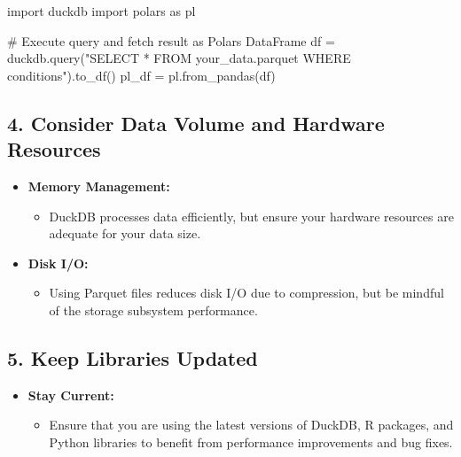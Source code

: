 \documentclass[
  american,
  10,
  a4paper,
]{book}
\newenvironment{Shaded}{\begin{snugshade}}{\end{snugshade}}
\newcommand{\CommentTok}[1]{\textcolor[rgb]{0.37,0.37,0.37}{#1}}
\newcommand{\ImportTok}[1]{\textcolor[rgb]{0.00,0.46,0.62}{#1}}
\newcommand{\NormalTok}[1]{\textcolor[rgb]{0.00,0.23,0.31}{#1}}
\newcommand{\OperatorTok}[1]{\textcolor[rgb]{0.37,0.37,0.37}{#1}}
\newcommand{\StringTok}[1]{\textcolor[rgb]{0.13,0.47,0.30}{#1}}
\providecommand{\tightlist}{%
  \setlength{\itemsep}{0pt}\setlength{\parskip}{0pt}}
\theoremstyle{definition}
\theoremstyle{remark}
\begin{document}
\begin{Shaded}
\begin{Highlighting}[]
\ImportTok{import}\NormalTok{ duckdb}
\ImportTok{import}\NormalTok{ polars }\ImportTok{as}\NormalTok{ pl}

\CommentTok{\# Execute query and fetch result as Polars DataFrame}
\NormalTok{df }\OperatorTok{=}\NormalTok{ duckdb.query(}\StringTok{"SELECT * FROM \textquotesingle{}your\_data.parquet\textquotesingle{} WHERE conditions"}\NormalTok{).to\_df()}
\NormalTok{pl\_df }\OperatorTok{=}\NormalTok{ pl.from\_pandas(df)}
\end{Highlighting}
\end{Shaded}

\subsection{\texorpdfstring{\textbf{4. Consider Data Volume and Hardware
Resources}}{4. Consider Data Volume and Hardware Resources}}\label{consider-data-volume-and-hardware-resources}

\begin{itemize}
\item
  \textbf{Memory Management:}

  \begin{itemize}
  \tightlist
  \item
    DuckDB processes data efficiently, but ensure your hardware
    resources are adequate for your data size.
  \end{itemize}
\item
  \textbf{Disk I/O:}

  \begin{itemize}
  \tightlist
  \item
    Using Parquet files reduces disk I/O due to compression, but be
    mindful of the storage subsystem performance.
  \end{itemize}
\end{itemize}

\subsection{\texorpdfstring{\textbf{5. Keep Libraries
Updated}}{5. Keep Libraries Updated}}\label{keep-libraries-updated}

\begin{itemize}
\item
  \textbf{Stay Current:}

  \begin{itemize}
  \tightlist
  \item
    Ensure that you are using the latest versions of DuckDB, R packages,
    and Python libraries to benefit from performance improvements and
    bug fixes.
  \end{itemize}
\end{itemize}
\end{document}
